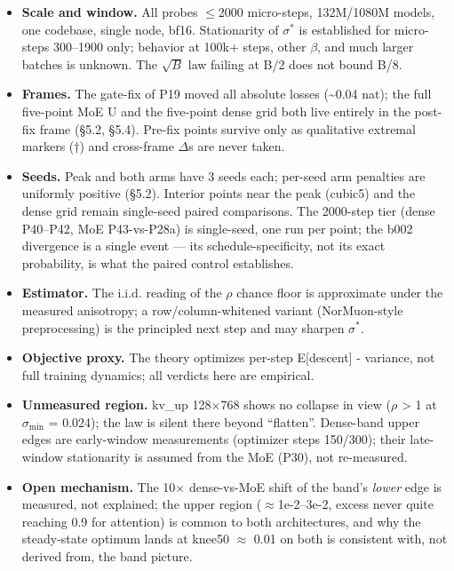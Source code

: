 \documentclass[
]{article}
\providecommand{\tightlist}{%
  \setlength{\itemsep}{0pt}\setlength{\parskip}{0pt}}
\begin{document}
\begin{itemize}
\tightlist
\item
  \textbf{Scale and window.} All probes \(\leq\){}2000 micro-steps,
  132M/1080M models, one codebase, single node, bf16. Stationarity of
  \(\sigma^*\) is established for micro-steps 300--1900 only; behavior
  at 100k+ steps, other \(\beta\), and much larger batches is unknown.
  The \(\sqrt{B}\) law failing at B/2 does not bound B/8.
\item
  \textbf{Frames.} The gate-fix of P19 moved all absolute losses
  (\textasciitilde0.04 nat); the full five-point MoE U and the
  five-point dense grid both live entirely in the post-fix frame (§5.2,
  §5.4). Pre-fix points survive only as qualitative extremal markers (†)
  and cross-frame \(\Delta\){}s are never taken.
\item
  \textbf{Seeds.} Peak and both arms have 3 seeds each; per-seed arm
  penalties are uniformly positive (§5.2). Interior points near the peak
  (cubic5) and the dense grid remain single-seed paired comparisons. The
  2000-step tier (dense P40--P42, MoE P43-vs-P28a) is single-seed, one
  run per point; the b002 divergence is a single event --- its
  schedule-specificity, not its exact probability, is what the paired
  control establishes.
\item
  \textbf{Estimator.} The i.i.d. reading of the \(\rho\) chance floor is
  approximate under the measured anisotropy; a row/column-whitened
  variant (NorMuon-style preprocessing) is the principled next step and
  may sharpen \(\sigma^*\).
\item
  \textbf{Objective proxy.} The theory optimizes per-step E{[}descent{]}
  - variance, not full training dynamics; all verdicts here are
  empirical.
\item
  \textbf{Unmeasured region.} kv\_up 128\(\times\){}768 shows no
  collapse in view (\(\rho\) \textgreater{} 1 at \(\sigma_{\min}\) =
  0.024); the law is silent there beyond ``flatten''. Dense-band upper
  edges are early-window measurements (optimizer steps 150/300); their
  late-window stationarity is assumed from the MoE (P30), not
  re-measured.
\item
  \textbf{Open mechanism.} The 10\(\times\) dense-vs-MoE shift of the
  band's \emph{lower} edge is measured, not explained; the upper region
  (\(\approx\){}1e-2--3e-2, excess never quite reaching 0.9 for
  attention) is common to both architectures, and why the steady-state
  optimum lands at knee50 \(\approx\) 0.01 on both is consistent with,
  not derived from, the band picture.
\end{itemize}
\end{document}
